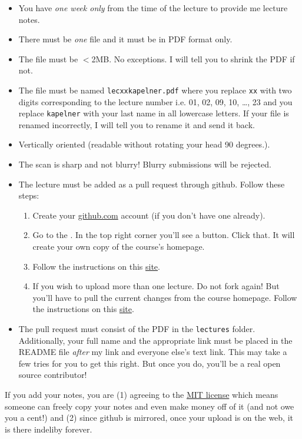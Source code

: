 \begin{itemize}
\item You have \emph{one week only} from the time of the lecture to provide me lecture notes.
\item There must be \emph{one} file and it must be in PDF format only. 
\item The file must be $<$2MB. No exceptions. I will tell you to shrink the PDF if not.
\item The file must be named \texttt{lecxxkapelner.pdf} where you replace \texttt{xx} with two digits corresponding to the lecture number i.e. 01, 02, 09, 10, \ldots, 23 and you replace \texttt{kapelner} with your last name in all lowercase letters. If your file is renamed incorrectly, I will tell you to rename it and send it back.
\item Vertically oriented (readable without rotating your head 90 degrees.).
\item The scan is sharp and not blurry! Blurry submissions will be rejected.
\item The lecture must be added as a pull request through github. Follow these steps:

\begin{enumerate}[1.]
\item Create your \url{github.com} account (if you don't have one already).
\item Go to the \coursewebpagelink. In the top right corner you'll see a  button. Click that. It will create your own copy of the course's homepage.
\item Follow the instructions on this \href{https://opensource.com/article/19/7/create-pull-request-github}{site}.
\item If you wish to upload more than one lecture. Do not fork again! But you'll have to pull the current changes from the course homepage. Follow the instructions on this \href{https://docs.github.com/en/free-pro-team@latest/github/collaborating-with-issues-and-pull-requests/syncing-a-fork}{site}. 
\end{enumerate}
\item The pull request must consist of the PDF in the \texttt{lectures} folder. Additionally, your full name and the appropriate link must be placed in the README file \emph{after} my link and everyone else's text link. This may take a few tries for you to get this right. But once you do, you'll be a real open source contributor!
\end{itemize}

\noindent If you add your notes, you are (1) agreeing to the \href{https://opensource.org/licenses/MIT}{MIT license} which means someone can freely copy your notes and even make money off of it (and not owe you a cent!) and (2) since github is mirrored, once your upload is on the web, it is there indeliby forever. 
